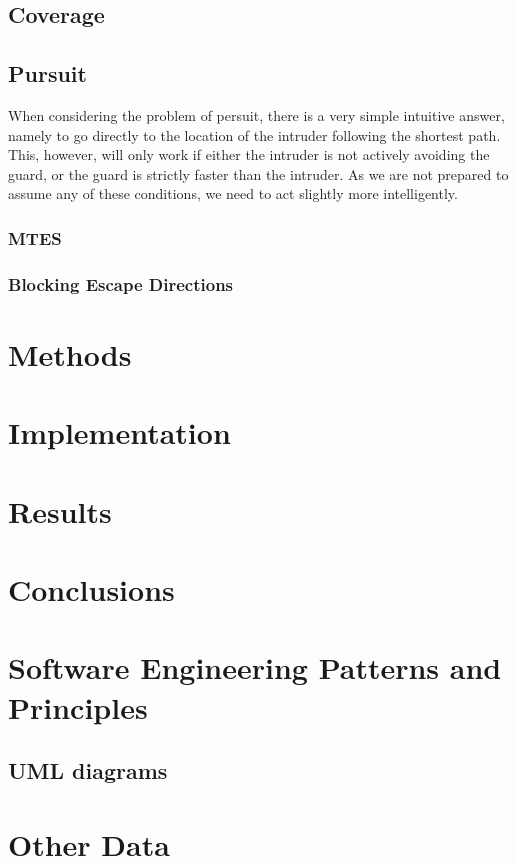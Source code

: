 \documentclass{report}
\begin{document}
	\section{Coverage}

	\section{Pursuit}
		When considering the problem of persuit, there is a very simple intuitive answer, namely to go directly to the location of the intruder following the shortest path. This, however, will only work if either the intruder is not actively avoiding the guard, or the guard is strictly faster than the intruder. As we are not prepared to assume any of these conditions, we need to act slightly more intelligently.

		\subsection{MTES}
			

		\subsection{Blocking Escape Directions}
			

\chapter{Methods}

\chapter{Implementation}

\chapter{Results}


\chapter{Conclusions}




\begin{appendices}
\chapter{Software Engineering Patterns and Principles}	
	\section{UML diagrams}
\chapter{Other Data}
	
\end{appendices}
\end{document}
